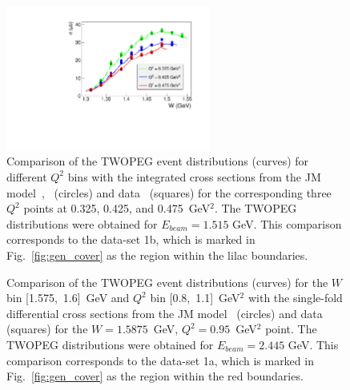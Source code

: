 \begin{figure}[!ht]
\begin{center}
\includegraphics[width=0.6\textwidth]{pictures/quality/fedotov_wdep_3q2bins_gen_comp.pdf}
\end{center}
\vspace{-0.6cm}
\caption{\small Comparison of the TWOPEG event distributions (curves) for different $Q^2$ bins with the integrated cross sections from the JM model~\cite{Mokeev:2008iw},~\cite{Mokeev:2012vsa} (circles) and data~\cite{Fedotov:2008aa} (squares) for the corresponding three $Q^2$ points at 0.325, 0.425, and 0.475~GeV$^2$. The TWOPEG distributions were obtained for $E_{beam} = 1.515$ GeV. This comparison corresponds to the data-set 1b, which is marked in Fig.~\ref{fig:gen_cover} as the region within the lilac boundaries.}
\label{fig:eg_fed}
\end{figure}

\clearpage
\newpage


\begin{figure}[!ht]
\begin{center}
\end{center}
\vspace{-0.6cm}
\caption{\small Comparison of the TWOPEG event distributions (curves) for the $W$ bin [1.575,~1.6]~GeV and $Q^2$ bin [0.8,~1.1]~GeV$^2$ with the single-fold differential cross sections from the JM model~\cite{Mokeev:2015lda} (circles) and data~\cite{Ripani:2002ss} (squares) for the $W = 1.5875$~GeV, $Q^2 = 0.95$~GeV$^2$ point. The TWOPEG distributions were obtained for $E_{beam} = 2.445$ GeV. This comparison corresponds to the data-set 1a, which is marked in Fig.~\ref{fig:gen_cover} as the region within the red boundaries.}
\label{fig:eg_rip_095_15875}
\end{figure}



